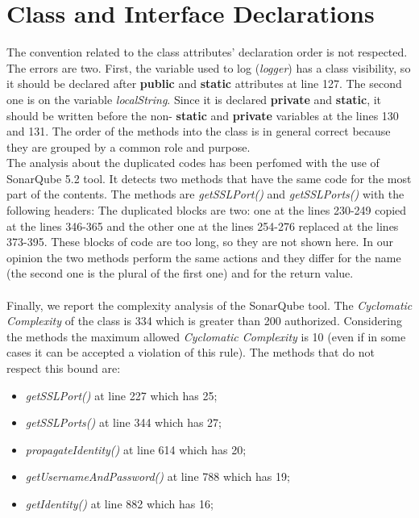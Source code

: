 \documentclass[\mainpath/main]{subfiles}
\begin{document}
\section{Class and Interface Declarations}
\label{CodeInspectionChecklist:ClassandInterfaceDeclarations}
The convention related to the class attributes' declaration order is not respected. The errors are two. First, the variable used to log (\textit{\textunderscore logger}) has a class visibility, so it should be declared after \textbf{\color{javapurple} public} and \textbf{\color{javapurple} static} attributes at line 127.
The second one is on the variable \textit{localString}. Since it is declared \textbf{\color{javapurple} private} and \textbf{\color{javapurple} static}, it should be written before the non-\textbf{\color{javapurple} static} and \textbf{\color{javapurple} private} variables at the lines 130 and 131.
The order of the methods into the class is in general correct because they are grouped by a common role and purpose.\\
The analysis about the duplicated codes has been perfomed with the use of SonarQube 5.2 tool. It detects two methods that have the same code for the most part of the contents. The methods are \textit{getSSLPort(\textellipsis)} and \textit{getSSLPorts(\textellipsis)} with the following headers:
The duplicated blocks are two: one at the lines 230-249 copied at the lines 346-365 and the other one at the lines 254-276 replaced at the lines 373-395. These blocks of code are too long, so they are not shown here. In our opinion the two methods perform the same actions and they differ for the name (the second one is the plural of the first one) and for the return value.\\
\\
Finally, we report the complexity analysis of the SonarQube tool. The \textit{Cyclomatic Complexity} of the class is 334 which is greater than 200 authorized. Considering the methods the maximum allowed \textit{Cyclomatic Complexity} is 10 (even if in some cases it can be accepted a violation of this rule). The methods that do not respect this bound are:
\begin{itemize}
	\item \textit{getSSLPort(\textellipsis)} at line 227 which has 25;
	\item \textit{getSSLPorts(\textellipsis)} at line 344 which has 27;
	\item \textit{propagateIdentity(\textellipsis)} at line 614 which has 20;
	\item \textit{getUsernameAndPassword(\textellipsis)} at line 788 which has 19;
	\item \textit{getIdentity()} at line 882 which has 16;
\end{itemize}
\end{document}
